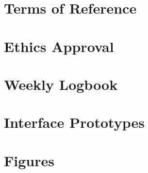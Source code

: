 \documentclass[11pt, twoside, a4paper]{report}
\newcommand*\cleartoleftpage{%
  \clearpage
  \ifodd\value{page}\hbox{}\newpage\fi
}
\begin{document}
\section{Terms of Reference}


\section{Ethics Approval}\label{sec:ethics_approval}


\section{Weekly Logbook}
\raggedbottom{}

\flushbottom{}



\cleartoleftpage\section{Interface Prototypes}


\cleartoleftpage\section{Figures}




\todos{}

\end{document}
